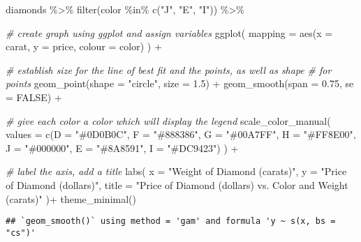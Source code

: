 \documentclass[
]{article}
\newenvironment{Shaded}{\begin{snugshade}}{\end{snugshade}}
\newcommand{\AttributeTok}[1]{\textcolor[rgb]{0.77,0.63,0.00}{#1}}
\newcommand{\CommentTok}[1]{\textcolor[rgb]{0.56,0.35,0.01}{\textit{#1}}}
\newcommand{\ConstantTok}[1]{\textcolor[rgb]{0.00,0.00,0.00}{#1}}
\newcommand{\FloatTok}[1]{\textcolor[rgb]{0.00,0.00,0.81}{#1}}
\newcommand{\FunctionTok}[1]{\textcolor[rgb]{0.00,0.00,0.00}{#1}}
\newcommand{\NormalTok}[1]{#1}
\newcommand{\SpecialCharTok}[1]{\textcolor[rgb]{0.00,0.00,0.00}{#1}}
\newcommand{\StringTok}[1]{\textcolor[rgb]{0.31,0.60,0.02}{#1}}
\begin{document}
\begin{Shaded}
\begin{Highlighting}[]
\NormalTok{diamonds }\SpecialCharTok{\%\textgreater{}\%}
\FunctionTok{filter}\NormalTok{(color }\SpecialCharTok{\%in\%} \FunctionTok{c}\NormalTok{(}\StringTok{"J"}\NormalTok{, }\StringTok{"E"}\NormalTok{, }\StringTok{"I"}\NormalTok{)) }\SpecialCharTok{\%\textgreater{}\%}

\CommentTok{\# create graph using ggplot and assign variables}
\FunctionTok{ggplot}\NormalTok{(}
\AttributeTok{mapping =} \FunctionTok{aes}\NormalTok{(}\AttributeTok{x =}\NormalTok{ carat, }\AttributeTok{y =}\NormalTok{ price, }\AttributeTok{colour =}\NormalTok{ color)}
\NormalTok{) }\SpecialCharTok{+}

\CommentTok{\# establish size for the line of best fit and the points, as well as shape}
\CommentTok{\# for points}
\FunctionTok{geom\_point}\NormalTok{(}\AttributeTok{shape =} \StringTok{"circle"}\NormalTok{, }\AttributeTok{size =} \FloatTok{1.5}\NormalTok{) }\SpecialCharTok{+}
\FunctionTok{geom\_smooth}\NormalTok{(}\AttributeTok{span =} \FloatTok{0.75}\NormalTok{, }\AttributeTok{se =} \ConstantTok{FALSE}\NormalTok{) }\SpecialCharTok{+}

\CommentTok{\# give each color a color which will display the legend}
\FunctionTok{scale\_color\_manual}\NormalTok{(}
\AttributeTok{values =} \FunctionTok{c}\NormalTok{(}\AttributeTok{D =} \StringTok{"\#0D0B0C"}\NormalTok{,}
\AttributeTok{F =} \StringTok{"\#888386"}\NormalTok{,}
\AttributeTok{G =} \StringTok{"\#00A7FF"}\NormalTok{,}
\AttributeTok{H =} \StringTok{"\#FF8E00"}\NormalTok{,}
\AttributeTok{J =} \StringTok{"\#000000"}\NormalTok{,}
\AttributeTok{E =} \StringTok{"\#8A8591"}\NormalTok{,}
\AttributeTok{I =} \StringTok{"\#DC9423"}\NormalTok{)}
\NormalTok{) }\SpecialCharTok{+}

\CommentTok{\# label the axis, add a title}
\FunctionTok{labs}\NormalTok{(}
\AttributeTok{x =} \StringTok{"Weight of Diamond (carats)"}\NormalTok{,}
\AttributeTok{y =} \StringTok{"Price of Diamond (dollars)"}\NormalTok{,}
\AttributeTok{title =} \StringTok{"Price of Diamond (dollars) vs. Color and Weight (carats)"}
\NormalTok{)}\SpecialCharTok{+}
\FunctionTok{theme\_minimal}\NormalTok{()}
\end{Highlighting}
\end{Shaded}

\begin{verbatim}
## `geom_smooth()` using method = 'gam' and formula 'y ~ s(x, bs = "cs")'
\end{verbatim}
\end{document}
